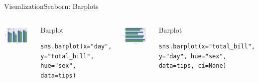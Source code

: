 \documentclass[10pt,compress]{beamer} %
\begin{document}
\begin{frame}[fragile]{Visualization}{Seaborn: Barplots}
	\begin{columns}
	\includegraphics[width=\textwidth]{figs/sns-barplot.png}\\
	\begin{exampleblock}{\footnotesize{Barplot}}
	\vspace{-0.2cm} 
	\begin{lstlisting}[basicstyle=\tiny]
	sns.barplot(x="day", y="total_bill", hue="sex", data=tips)
	\end{lstlisting}
	\vspace{-0.2cm} 
	\end{exampleblock}

	\includegraphics[width=\textwidth]{figs/sns-barplot2.png}\\
	\begin{exampleblock}{\footnotesize{Barplot}}
	\vspace{-0.2cm} 
	\begin{lstlisting}[basicstyle=\tiny]
	sns.barplot(x="total_bill", y="day", hue="sex", data=tips, ci=None)
	\end{lstlisting}
	\vspace{-0.2cm} 
	\end{exampleblock}
	\end{columns}
\end{frame}
\end{document}
